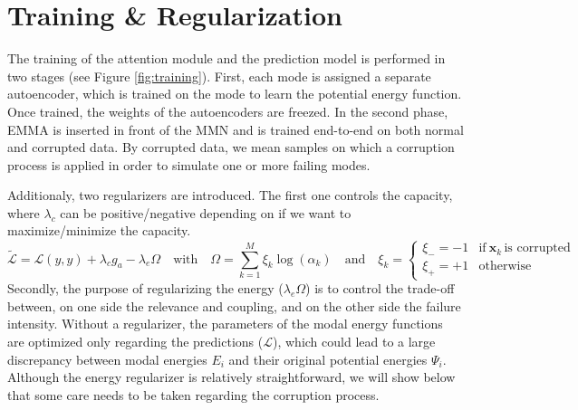 \section{Training \& Regularization}\label{sec:regul}
The training of the attention module and the prediction model is performed in two stages (see Figure \ref{fig:training}). First, each mode is assigned a separate autoencoder, which is trained on the mode to learn the potential energy function. Once trained, the weights of the autoencoders are freezed. In the second phase, EMMA is inserted in front of the MMN and is trained end-to-end on both normal and corrupted data. By corrupted data, we mean samples on which a corruption process is applied in order to simulate one or more failing modes.

Additionaly, two regularizers are introduced. The first one controls the capacity, where $\lambda_c$ can be positive/negative depending on if we want to maximize/minimize the capacity.
\begin{equation}
\tilde{\mathcal{L}} = \mathcal{L}(y,\hat{y}) + \lambda_c g_a - \lambda_e \Omega \quad \text{with} \quad \Omega = \sum_{k=1}^M \xi_k \log(\alpha_k) \quad \text{and} \quad \xi_k = \begin{cases}
      \xi_- = -1 & \text{if}\ \mathbf{x}_k\, \text{is corrupted} \\
      \xi_+ = +1 & \text{otherwise}
    \end{cases}
\label{eq:regularization}
\end{equation}
Secondly, the purpose of regularizing the energy ($\lambda_e \Omega$) is to control the trade-off between, on one side the relevance and coupling, and on the other side the failure intensity. Without a regularizer, the parameters of the modal energy functions are optimized only regarding the predictions ($\mathcal{L}$), which could lead to a large discrepancy between modal energies $E_i$ and their original potential energies $\Psi_i$. Although the energy regularizer is relatively straightforward, we will show below that some care needs to be taken regarding the corruption process.

